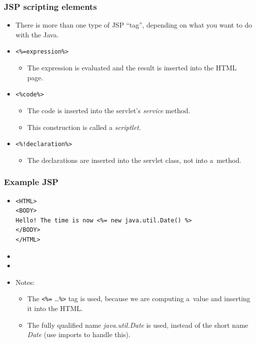 \documentclass[10pt,xcolor=pdflatex]{beamer}
\begin{document}
\begin{frame}[containsverbatim]\frametitle{JSP scripting elements}
	\begin{itemize}
    	\item There is more than one type of JSP “tag”, depending on what you want to do with the Java.
		\item \verb;<%=expression%>;
 		  \begin{itemize}
        	\item The expression is evaluated and the result is inserted into the HTML page.
          \end{itemize}
		\item \verb;<%code%>;
		  \begin{itemize}
        	\item The code is inserted into the servlet's \emph{service} method.
			\item This construction is called a \emph{scriptlet}.
          \end{itemize}
 		\item \verb;<%!declaration%>;
		  \begin{itemize}
        	\item The declarations are inserted into the servlet class, not into a~method.
		  \end{itemize}
    \end{itemize}
\end{frame}


\begin{frame}[containsverbatim]\frametitle{Example JSP}
	\begin{itemize}
    	\item[] \begin{footnotesize} \begin{verbatim}
<HTML>
<BODY>
Hello! The time is now <%= new java.util.Date() %>
</BODY>
</HTML>
\end{verbatim} \end{footnotesize}
		\item[]
        \item[]
    	\item Notes:
		  \begin{itemize}
        	\item The \texttt{<\%=} \ldots \texttt{\%>} tag is used, because we are computing a~value and inserting it into the HTML.
			\item The fully qualified name \emph{java.util.Date} is used, instead of the short name \emph{Date} (use imports to handle this).
          \end{itemize}
    \end{itemize}
\end{frame}
\end{document}
